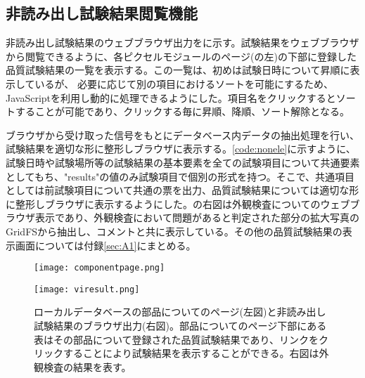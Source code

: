 \subsection{非読み出し試験結果閲覧機能}
\label{sec:non-elec-view}

非読み出し試験結果のウェブブラウザ出力をに示す。試験結果をウェブブラウザから閲覧できるように、各ピクセルモジュールのページ(の左)の下部に登録した品質試験結果の一覧を表示する。この一覧は、初めは試験日時について昇順に表示しているが、
必要に応じて別の項目におけるソートを可能にするため、JavaScriptを利用し動的に処理できるようにした。項目名をクリックするとソートすることが可能であり、クリックする毎に昇順、降順、ソート解除となる。

ブラウザから受け取った信号をもとにデータベース内データの抽出処理を行い、試験結果を適切な形に整形しブラウザに表示する。\cref{code:nonele}に示すように、試験日時や試験場所等の試験結果の基本要素を全ての試験項目について共通要素としてもち、"results"の値のみ試験項目で個別の形式を持つ。そこで、共通項目としては前試験項目について共通の票を出力、品質試験結果については適切な形に整形しブラウザに表示するようにした。の右図は外観検査についてのウェブブラウザ表示であり、外観検査において問題があると判定された部分の拡大写真のGridFSから抽出し、コメントと共に表示している。その他の品質試験結果の表示画面については付録\ref{sec:A1}にまとめる。

\begin{figure}[tbp]
  \begin{minipage}[b]{0.45\linewidth}
    \centering
    \texttt{[image: componentpage.png]}
  \end{minipage}
  \begin{minipage}[b]{0.45\linewidth}
    \centering
    \texttt{[image: viresult.png]}
  \end{minipage}
    \caption[非読み出し試験結果のブラウザ出力]{ローカルデータベースの部品についてのページ(左図)と非読み出し試験結果のブラウザ出力(右図)。部品についてのページ下部にある表はその部品について登録された品質試験結果であり、リンクをクリックすることにより試験結果を表示することができる。右図は外観検査の結果を表す。}
    \label{fig:noneleresult}
\end{figure}

